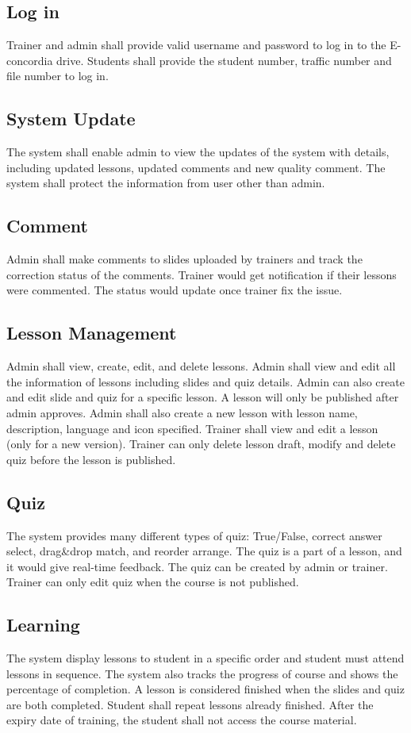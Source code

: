 \documentclass[a4paper]{article}
\begin{document}
\subsection{Log in}
Trainer and admin shall provide valid username and password to log in to the E-concordia drive. 
Students shall provide the student number, traffic number and file number to log in.
\bigskip
\subsection{System Update}
The system shall enable admin to view the updates of the system with details, including updated lessons, updated comments and new quality comment. The system shall protect the information from user other than admin.
\bigskip
\subsection{Comment}
Admin shall make comments to slides uploaded by trainers and track the correction status of the comments.  Trainer would get notification if their lessons were commented. The status would update once trainer fix the issue.
\bigskip
\subsection{Lesson Management}
Admin shall view, create, edit, and delete lessons. Admin shall view and edit all the information of lessons including slides and quiz details. Admin can also create and edit slide and quiz for a specific lesson. A lesson will only be published after admin approves. Admin shall also create a new lesson with lesson name, description, language and icon specified.
Trainer shall view and edit a lesson (only for a new version). Trainer can only delete lesson draft, modify and delete quiz before the lesson is published.
\bigskip
\subsection{Quiz}
The system provides many different types of quiz: True/False, correct answer select, drag\&drop match, and reorder arrange. The quiz is a part of a lesson, and it would give real-time feedback. The quiz can be created by admin or trainer. Trainer can only edit quiz when the course is not published.
\bigskip
\subsection{Learning}
The system display lessons to student in a specific order and student must attend lessons in sequence. The system also tracks the progress of course and shows the percentage of completion. A lesson is considered finished when the slides and quiz are both completed. Student shall repeat lessons already finished. After the expiry date of training, the student shall not access the course material. 
\bigskip
\end{document}
